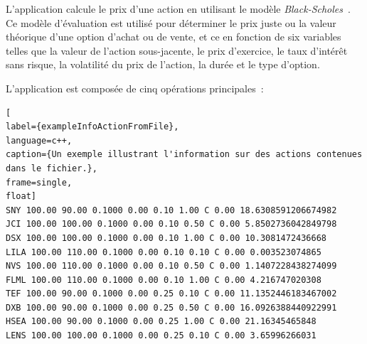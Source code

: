 L'application  calcule le prix d'une action en utilisant le modèle \emph{Black-Scholes}~\citep{macbeth1979empirical}. Ce mod\`ele d'\'evaluation est utilis\'e pour d\'eterminer le prix juste ou la valeur th\'eorique d'une option d'achat ou de vente, et ce en fonction de six variables telles que la valeur de l'action sous-jacente, le prix d'exercice, le taux d'int\'er\^et sans risque, la volatilit\'e du prix de l'action, la dur\'ee et le type d'option. 

L'application  est compos\'ee de cinq op\'erations principales~: 

\begin{lstlisting}[
label={exampleInfoActionFromFile},
language=c++,
caption={Un exemple illustrant l'information sur des actions contenues dans le fichier.},
frame=single,
float]
SNY 100.00 90.00 0.1000 0.00 0.10 1.00 C 0.00 18.6308591206674982
JCI 100.00 100.00 0.1000 0.00 0.10 0.50 C 0.00 5.8502736042849798
DSX 100.00 100.00 0.1000 0.00 0.10 1.00 C 0.00 10.3081472436668
LILA 100.00 110.00 0.1000 0.00 0.10 0.10 C 0.00 0.003523074865
NVS 100.00 110.00 0.1000 0.00 0.10 0.50 C 0.00 1.1407228438274099
FLML 100.00 110.00 0.1000 0.00 0.10 1.00 C 0.00 4.216747020308
TEF 100.00 90.00 0.1000 0.00 0.25 0.10 C 0.00 11.1352446183467002
DXB 100.00 90.00 0.1000 0.00 0.25 0.50 C 0.00 16.0926388440922991
HSEA 100.00 90.00 0.1000 0.00 0.25 1.00 C 0.00 21.16345465848
LENS 100.00 100.00 0.1000 0.00 0.25 0.10 C 0.00 3.65996266031
\end{lstlisting}

